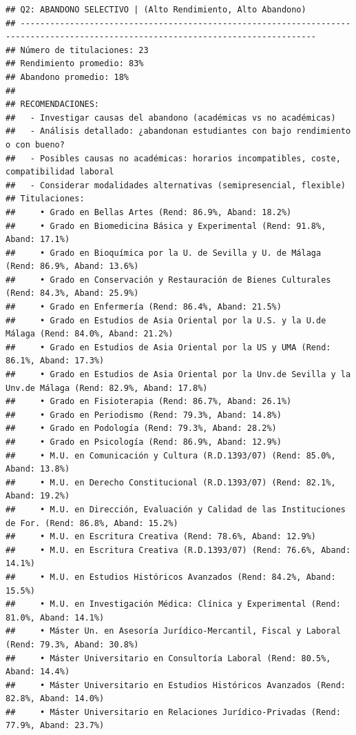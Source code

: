 \documentclass[
]{article}
\begin{document}
\begin{verbatim}
## Q2: ABANDONO SELECTIVO | (Alto Rendimiento, Alto Abandono)
## ---------------------------------------------------------------------------------------------------------------------------------- 
## Número de titulaciones: 23 
## Rendimiento promedio: 83% 
## Abandono promedio: 18% 
## 
## RECOMENDACIONES:
##   - Investigar causas del abandono (académicas vs no académicas)
##   - Análisis detallado: ¿abandonan estudiantes con bajo rendimiento o con bueno?
##   - Posibles causas no académicas: horarios incompatibles, coste, compatibilidad laboral
##   - Considerar modalidades alternativas (semipresencial, flexible)
## Titulaciones:
##     • Grado en Bellas Artes (Rend: 86.9%, Aband: 18.2%)
##     • Grado en Biomedicina Básica y Experimental (Rend: 91.8%, Aband: 17.1%)
##     • Grado en Bioquímica por la U. de Sevilla y U. de Málaga (Rend: 86.9%, Aband: 13.6%)
##     • Grado en Conservación y Restauración de Bienes Culturales (Rend: 84.3%, Aband: 25.9%)
##     • Grado en Enfermería (Rend: 86.4%, Aband: 21.5%)
##     • Grado en Estudios de Asia Oriental por la U.S. y la U.de Málaga (Rend: 84.0%, Aband: 21.2%)
##     • Grado en Estudios de Asia Oriental por la US y UMA (Rend: 86.1%, Aband: 17.3%)
##     • Grado en Estudios de Asia Oriental por la Unv.de Sevilla y la Unv.de Málaga (Rend: 82.9%, Aband: 17.8%)
##     • Grado en Fisioterapia (Rend: 86.7%, Aband: 26.1%)
##     • Grado en Periodismo (Rend: 79.3%, Aband: 14.8%)
##     • Grado en Podología (Rend: 79.3%, Aband: 28.2%)
##     • Grado en Psicología (Rend: 86.9%, Aband: 12.9%)
##     • M.U. en Comunicación y Cultura (R.D.1393/07) (Rend: 85.0%, Aband: 13.8%)
##     • M.U. en Derecho Constitucional (R.D.1393/07) (Rend: 82.1%, Aband: 19.2%)
##     • M.U. en Dirección, Evaluación y Calidad de las Instituciones de For. (Rend: 86.8%, Aband: 15.2%)
##     • M.U. en Escritura Creativa (Rend: 78.6%, Aband: 12.9%)
##     • M.U. en Escritura Creativa (R.D.1393/07) (Rend: 76.6%, Aband: 14.1%)
##     • M.U. en Estudios Históricos Avanzados (Rend: 84.2%, Aband: 15.5%)
##     • M.U. en Investigación Médica: Clínica y Experimental (Rend: 81.0%, Aband: 14.1%)
##     • Máster Un. en Asesoría Jurídico-Mercantil, Fiscal y Laboral (Rend: 79.3%, Aband: 30.8%)
##     • Máster Universitario en Consultoría Laboral (Rend: 80.5%, Aband: 14.4%)
##     • Máster Universitario en Estudios Históricos Avanzados (Rend: 82.8%, Aband: 14.0%)
##     • Máster Universitario en Relaciones Jurídico-Privadas (Rend: 77.9%, Aband: 23.7%)
\end{verbatim}
\end{document}
